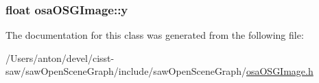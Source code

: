 \subsubsection[{y}]{\setlength{\rightskip}{0pt plus 5cm}float osa\+O\+S\+G\+Image\+::y\hspace{0.3cm}{\ttfamily [protected]}}\label{classosa_o_s_g_image_a6bee81116bbd53706ad648f61b74fc64}


The documentation for this class was generated from the following file\+:\begin{DoxyCompactItemize}
\item 
/\+Users/anton/devel/cisst-\/saw/saw\+Open\+Scene\+Graph/include/saw\+Open\+Scene\+Graph/\hyperlink{osa_o_s_g_image_8h}{osa\+O\+S\+G\+Image.\+h}\end{DoxyCompactItemize}
